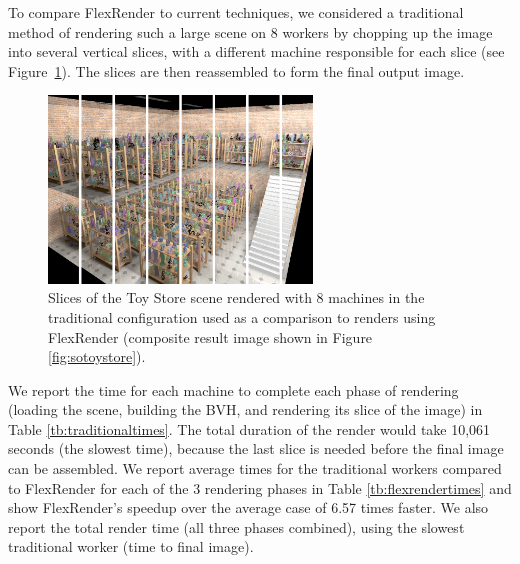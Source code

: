 \documentclass[a4paper,twoside]{article}
\begin{document}
To compare FlexRender to current techniques, we considered a traditional method
of rendering such a large scene on 8 workers by chopping up the image into
several vertical slices, with a different machine responsible for each slice (see Figure~\ref{fig:toystoresliced}).
The slices are then reassembled to form the final output image.

\begin{figure}[h!]
    \centering
    \includegraphics[width=70mm]{images/toystore-sliced.png}
    \caption{Slices of the Toy Store scene rendered with 8 machines in the traditional configuration used as a comparison to renders using FlexRender (composite result image shown in Figure \ref{fig:sotoystore}).}
    \label{fig:toystoresliced}
\end{figure}

We report the time for each machine to complete each phase of rendering (loading
the scene, building the BVH, and rendering its slice of the image) in Table
\ref{tb:traditionaltimes}. The total duration of the render would take 10,061
seconds (the slowest time), because the last slice is needed before the final
image can be assembled. We report average times for the traditional workers
compared to FlexRender for each of the 3 rendering phases in Table
\ref{tb:flexrendertimes} and show FlexRender's speedup over the average case of 6.57 times
faster.
We also report the total render time (all three phases combined), using the
slowest traditional worker (time to final image).
\end{document}
